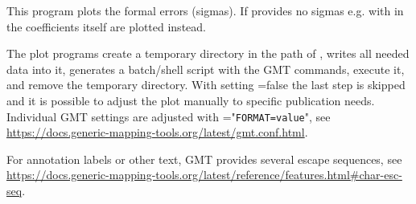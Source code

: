 This program plots the formal errors (sigmas).
If  provides no sigmas
e.g. with  in 
the coefficients itself are plotted instead.

The plot programs create a temporary directory in the path of , writes all needed data into it,
generates a batch/shell script with the GMT commands, execute it, and remove the temporary directory.
With setting =false the last step is skipped and it is possible to adjust the plot manually
to specific publication needs. Individual GMT settings are adjusted with ="\verb|FORMAT=value|",
see \url{https://docs.generic-mapping-tools.org/latest/gmt.conf.html}.

For annotation labels or other text, GMT provides several escape sequences, see
\url{https://docs.generic-mapping-tools.org/latest/reference/features.html#char-esc-seq}.



